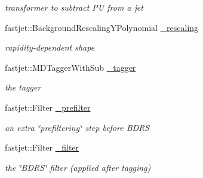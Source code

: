 \begin{CompactItemize}
\begin{CompactList}\small\item\em transformer to subtract PU from a jet \item\end{CompactList}\item 
\hypertarget{classHZAnalysis_0587053cc0f7b9685df0f1763dae8347}{
fastjet::Background\-Rescaling\-YPolynomial \hyperlink{classHZAnalysis_0587053cc0f7b9685df0f1763dae8347}{\_\-rescaling}}
\label{classHZAnalysis_0587053cc0f7b9685df0f1763dae8347}

\begin{CompactList}\small\item\em rapidity-dependent shape \item\end{CompactList}\item 
\hypertarget{classHZAnalysis_c9b7b6215f2e1a4fc3b90bfbdc8ca3b8}{
fastjet::MDTagger\-With\-Sub \hyperlink{classHZAnalysis_c9b7b6215f2e1a4fc3b90bfbdc8ca3b8}{\_\-tagger}}
\label{classHZAnalysis_c9b7b6215f2e1a4fc3b90bfbdc8ca3b8}

\begin{CompactList}\small\item\em the tagger \item\end{CompactList}\item 
\hypertarget{classHZAnalysis_dbca3bb7e4598ea1aee28340575abbca}{
fastjet::Filter \hyperlink{classHZAnalysis_dbca3bb7e4598ea1aee28340575abbca}{\_\-prefilter}}
\label{classHZAnalysis_dbca3bb7e4598ea1aee28340575abbca}

\begin{CompactList}\small\item\em an extra \char`\"{}prefiltering\char`\"{} step before BDRS \item\end{CompactList}\item 
\hypertarget{classHZAnalysis_192b43fa66751f51a8d86106079a0b9f}{
fastjet::Filter \hyperlink{classHZAnalysis_192b43fa66751f51a8d86106079a0b9f}{\_\-filter}}
\label{classHZAnalysis_192b43fa66751f51a8d86106079a0b9f}

\begin{CompactList}\small\item\em the \char`\"{}BDRS\char`\"{} filter (applied after tagging) \item\end{CompactList}\end{CompactItemize}


